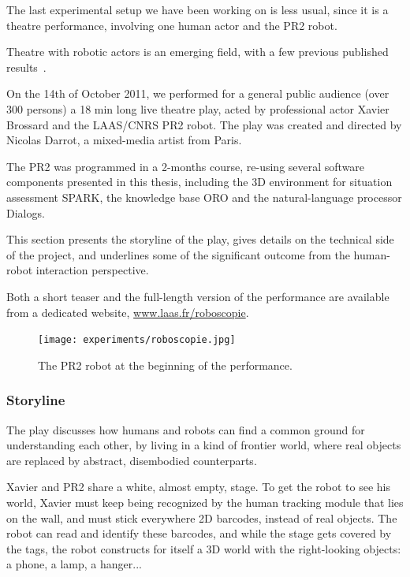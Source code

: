 The last experimental setup we have been working on is less usual, since it is
a theatre performance, involving one human actor and the PR2 robot.

Theatre with robotic actors is an emerging field, with a few previous published
results~\cite{Breazeal2003, Lin2009, Mavridis2009}.

On the 14th of October 2011, we performed for a general public audience (over
300 persons) a 18 min long live theatre play, acted by professional actor
Xavier Brossard and the LAAS/CNRS PR2 robot. The play was created and directed
by Nicolas Darrot, a mixed-media artist from Paris.

The PR2 was programmed in a 2-months course, re-using several software
components presented in this thesis, including the 3D environment for situation
assessment SPARK, the knowledge base ORO and the natural-language
processor {\sc Dialogs}.

This section presents the storyline of the play, gives details on the technical
side of the project, and underlines some of the significant outcome from the
human-robot interaction perspective.

Both a short teaser and the full-length version of the performance are
available from a dedicated website, \url{www.laas.fr/roboscopie}.

\begin{figure}
    \centering
    \texttt{[image: experiments/roboscopie.jpg]}
    \caption{The PR2 robot at the beginning of the performance.}
    \label{fig|pr2-opens-curtains}
\end{figure}


\subsubsection{Storyline}

The play discusses how humans and robots can find a common ground for understanding
each other, by living in a kind of frontier world, where real objects are replaced 
by abstract, disembodied counterparts.

Xavier and PR2 share a white, almost empty, stage. To get the robot to see his
world, Xavier must keep being recognized by the human tracking module that lies
on the wall, and must stick everywhere 2D barcodes, instead of real
objects. The robot can read and identify these barcodes, and while the stage
gets covered by the tags, the robot constructs for itself a 3D world with the
right-looking objects: a phone, a lamp, a hanger...

